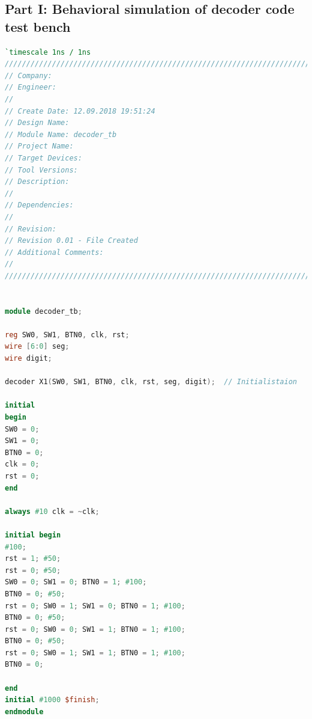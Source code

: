 \subsection{Part I: Behavioral simulation of decoder code test bench} \label{subsec: Part I: behavioral simulation of decoder code test bench}
\begin{lstlisting}[language=verilog,caption={Testbanche decoder part I.},label=lst: Testbanche decoder]
`timescale 1ns / 1ns
//////////////////////////////////////////////////////////////////////////////////
// Company: 
// Engineer: 
// 
// Create Date: 12.09.2018 19:51:24
// Design Name: 
// Module Name: decoder_tb
// Project Name: 
// Target Devices: 
// Tool Versions: 
// Description: 
// 
// Dependencies: 
// 
// Revision:
// Revision 0.01 - File Created
// Additional Comments:
// 
//////////////////////////////////////////////////////////////////////////////////


module decoder_tb;

reg SW0, SW1, BTN0, clk, rst;
wire [6:0] seg;
wire digit;

decoder X1(SW0, SW1, BTN0, clk, rst, seg, digit);  // Initialistaion

initial 
begin
SW0 = 0;
SW1 = 0;
BTN0 = 0;
clk = 0;
rst = 0;
end

always #10 clk = ~clk;

initial begin
#100;
rst = 1; #50;
rst = 0; #50;
SW0 = 0; SW1 = 0; BTN0 = 1; #100;
BTN0 = 0; #50;
rst = 0; SW0 = 1; SW1 = 0; BTN0 = 1; #100;
BTN0 = 0; #50;
rst = 0; SW0 = 0; SW1 = 1; BTN0 = 1; #100;
BTN0 = 0; #50;
rst = 0; SW0 = 1; SW1 = 1; BTN0 = 1; #100;
BTN0 = 0; 

end
initial #1000 $finish;
endmodule
\end{lstlisting}

